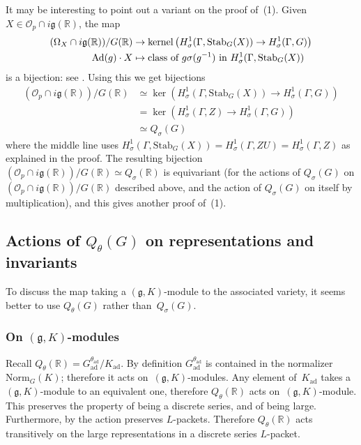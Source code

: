 \documentclass[10pt,leqno]{article}
\newcommand{\kernel}{\mathrm{kernel}}
\newcommand{\ad}{\mathrm{ad}}
\newcommand{\Gad}{G_\mathrm{ad}}
\newcommand{\Kad}{K_\mathrm{ad}}
\newcommand{\Stab}{\mathrm{Stab}}
\renewcommand{\O}{\mathcal O}
\newcommand{\R}{\mathbb R}
\newcommand{\g}{\mathfrak g}
\newcommand{\Op}{\O_p}
\begin{document}
It may be interesting to point out a variant on the proof of~(1). Given $X \in \Op \cap i\g(\R)$, the map 
\begin{align} \label{bij_q_2} (\Omega_{X} \cap i\g(\R))/G(\R) & \to \kernel\left(H^1_\sigma(\Gamma,\mathrm{Stab}_G(X))\rightarrow H^1_\sigma(\Gamma,G)\right) \\ \mathrm{Ad}(g) \cdot X & \mapsto \text{class of $ g\sigma(g^{-1})$ in $H^1_\sigma(\Gamma,\mathrm{Stab}_G(X))$} \nonumber \end{align} 
is a bijection: see \cite[Lemma 5.2]{galois}. 
Using this we get bijections
$$
\begin{aligned}
(\Op\cap i\g(\R))/G(\R)&\simeq \ker(H^1_\sigma(\Gamma,\Stab_G(X))\rightarrow H^1_\sigma(\Gamma,G))\\
&=
\ker(H^1_\sigma(\Gamma,Z)\rightarrow H^1_\sigma(\Gamma,G))\\
&\simeq Q_{\sigma}(G)
\end{aligned}
$$
where the middle line uses $H^1_\sigma(\Gamma,\Stab_G(X))=H^1_\sigma(\Gamma,ZU)=H^1_\sigma(\Gamma,Z)$ as explained in the proof. The resulting bijection  $(\Op\cap i\g(\R))/G(\R)\simeq Q_\sigma(\R)$ is equivariant (for the actions of $Q_\sigma(G)$ on $(\Op\cap i\g(\R))/G(\R)$ described above, and the action of  $Q_\sigma(G)$ on itself by multiplication), and this gives another proof of~(1). 

\subsection{Actions of $Q_\theta(G)$ on representations and invariants}

To discuss the map taking a $(\g, K)$-module to the associated variety, it seems better to use $Q_{\theta}(G)$ rather than~$Q_{\sigma}(G)$. 


 \subsubsection*{On $(\g, K)$-modules} 
 
 Recall $Q_{\theta}(\R)=\Gad^{\theta_{\ad}}/\Kad$. By definition $\Gad^{\theta_{\ad}}$ is contained in the normalizer $\mathrm{Norm}_G(K)$; therefore it acts on~$(\g, K)$-modules. Any element of~$\Kad$ takes a $(\g,K)$-module to an equivalent one, therefore $Q_{\theta}(\R)$ acts on~$(\g, K)$-module. This preserves the property of being a discrete series, and of being large. Furthermore, by \cite[Lemma 6.18 and Remark 6.19]{Contragredient} the action preserves $L$-packets. Therefore $Q_{\theta}(\R)$ acts transitively on the large representations in a discrete series $L$-packet.
  
\end{document}

